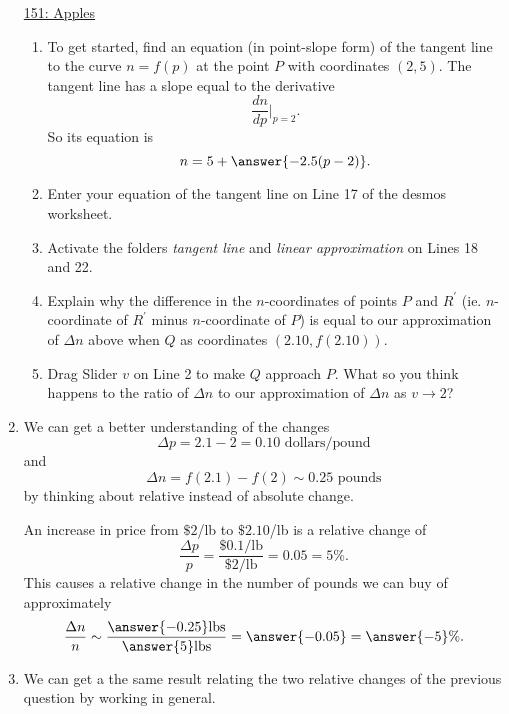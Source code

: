 \documentclass{ximera}
\begin{document}
\begin{question}
\begin{enumerate}
\begin{onlineOnly}
    \begin{center}
\end{center}
\end{onlineOnly}

\href{https://www.desmos.com/calculator/qw7wislq0c}{151: Apples}

\begin{enumerate}
\item To get started, find an equation (in point-slope form) of the tangent line to the curve $n=f(p)$ at the point $P$ with coordinates $(2,5)$. The tangent line has a slope equal to the derivative 
\[
   \frac{dn}{dp} \Big|_{p=2} .
\]
So its equation is 
\[
      n = 5 + \answer{-2.5(p-2)} .
\]

\item Enter your equation of the tangent line on Line 17 of the desmos worksheet.

\item Activate the folders \emph{tangent line} and \emph{linear approximation} on Lines 18 and 22. 

\item Explain why the difference in the $n$-coordinates of points $P$ and $R^\prime$ (ie. $n$-coordinate of $R^\prime$ minus $n$-coordinate of $P$) is equal to our approximation of $\Delta n$ above when $Q$ as coordinates $(2.10,f(2.10))$.

\item Drag Slider $v$ on Line 2 to make $Q$ approach $P$. What so  you think happens to the ratio of $\Delta n$ to our approximation of $\Delta n$ as $v\to 2$?
\end{enumerate}


\item We can get a better understanding of the changes 
\[
      \Delta p = 2.1 - 2 = 0.10 \text{ dollars/pound}
\]
and 
\[
   \Delta n = f(2.1)-f(2) \sim 0.25 \text { pounds}
\]
by thinking about relative instead of absolute change.

An increase in price from $\$2$/lb to $\$2.10$/lb is a relative change of
\[
    \frac{\Delta p}{p} = \frac{\$0.1/\text{lb}}{\$ 2/\text{lb}} = 0.05 = 5\% .
\]
This causes a relative change in the number of pounds we can buy of approximately
\[
    \frac{\Delta n}{n} \sim \frac{\answer{-0.25} \text{lbs}}{\answer{5}\text{lbs}} = \answer{-0.05} = \answer{-5}\%.
\]
 
\item We can get a the same result relating the two relative changes of the previous question by working in general. 


\end{enumerate}
\end{question}
\end{document}
